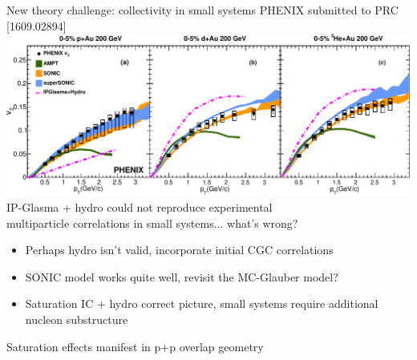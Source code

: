\documentclass{beamer}
\begin{document}
\begin{frame}{New theory challenge: collectivity in small systems}
  \centering
  {\tiny PHENIX submitted to PRC [1609.02894]} \\
  \includegraphics[width=.85\columnwidth]{phenix_models} \\[1ex]
  \small IP-Glasma + hydro could not reproduce experimental\\multiparticle correlations in small systems... what's wrong? \\[1ex]
  \begin{itemize}
    \item Perhaps hydro isn't valid, incorporate initial CGC correlations
    \item SONIC model works quite well, revisit the MC-Glauber model?
    \item Saturation IC + hydro correct picture, small systems require additional nucleon substructure
  \end{itemize}
\end{frame}

\begin{frame}{Saturation effects manifest in p+p overlap geometry}
  \vspace{.06\textheight}
  \begin{figure}[t]
  \end{figure}
\end{frame}
\end{document}

